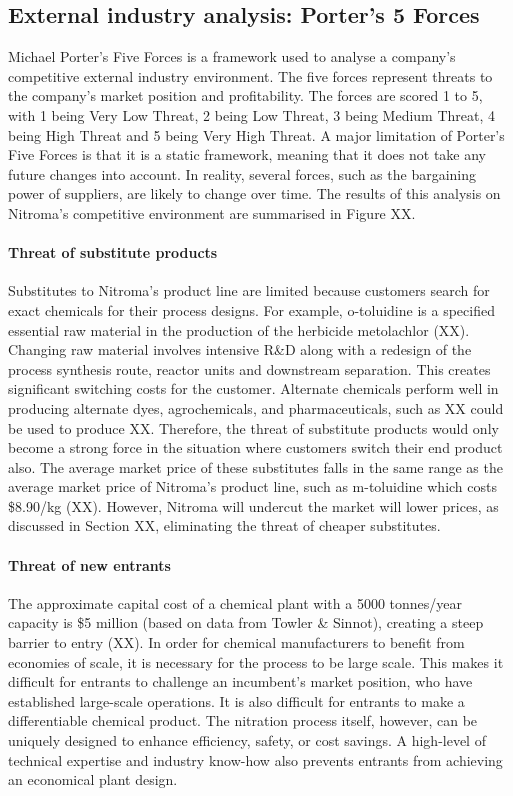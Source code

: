 \subsection{External industry analysis: Porter's 5 Forces}
Michael Porter’s Five Forces is a framework used to analyse a company’s competitive external industry environment. The five forces represent threats to the company’s market position and profitability. The forces are scored 1 to 5, with 1 being Very Low Threat, 2 being Low Threat, 3 being Medium Threat, 4 being High Threat and 5 being Very High Threat. A major limitation of Porter’s Five Forces is that it is a static framework, meaning that it does not take any future changes into account. In reality, several forces, such as the bargaining power of suppliers, are likely to change over time. The results of this analysis on Nitroma’s competitive environment are summarised in Figure XX.

\paragraph{Threat of substitute products}
Substitutes to Nitroma’s product line are limited because customers search for exact chemicals for their process designs. For example, o-toluidine is a specified essential raw material in the production of the herbicide metolachlor (XX). Changing raw material involves intensive R\&D along with a redesign of the process synthesis route, reactor units and downstream separation. This creates significant switching costs for the customer. Alternate chemicals perform well in producing alternate dyes, agrochemicals, and pharmaceuticals, such as XX could be used to produce XX. Therefore, the threat of substitute products would only become a strong force in the situation where customers switch their end product also. The average market price of these substitutes falls in the same range as the average market price of Nitroma’s product line, such as m-toluidine which costs \$8.90/kg (XX). However, Nitroma will undercut the market will lower prices, as discussed in Section XX, eliminating the threat of cheaper substitutes.

\paragraph{Threat of new entrants}
The approximate capital cost of a chemical plant with a 5000 tonnes/year capacity is \$5 million (based on data from Towler \& Sinnot), creating a steep barrier to entry (XX). In order for chemical manufacturers to benefit from economies of scale, it is necessary for the process to be large scale. This makes it difficult for entrants to challenge an incumbent’s market position, who have established large-scale operations. It is also difficult for entrants to make a differentiable chemical product. The nitration process itself, however, can be uniquely designed to enhance efficiency, safety, or cost savings. A high-level of technical expertise and industry know-how also prevents entrants from achieving an economical plant design.  

